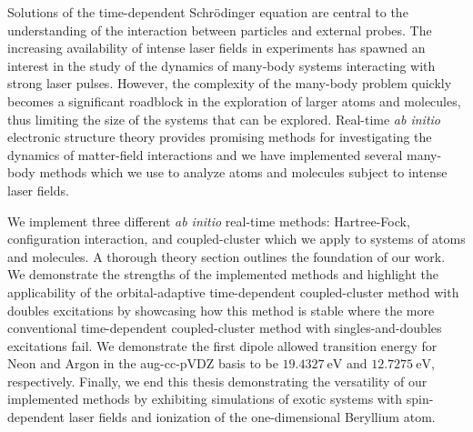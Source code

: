 Solutions of the time-dependent Schrödinger equation are central to the
understanding of the interaction between particles and external probes.
The increasing availability of intense laser fields in experiments has spawned
an interest in the study of the dynamics of many-body systems interacting with
strong laser pulses.
However, the complexity of the many-body problem quickly becomes a significant
roadblock in the exploration of larger atoms and molecules, thus limiting the
size of the systems that can be explored.
Real-time \textit{ab initio} electronic structure theory provides promising
methods for investigating the dynamics of matter-field interactions and we have
implemented several many-body methods which we use to analyze atoms and
molecules subject to intense laser fields.

We implement three different \textit{ab initio} real-time methods:
Hartree-Fock, configuration interaction, and coupled-cluster which we apply to
systems of atoms and molecules.
A thorough theory section outlines the foundation of our work.
We demonstrate the strengths of the implemented methods and highlight the
applicability of the orbital-adaptive time-dependent coupled-cluster method with
doubles excitations by showcasing how this method is stable where the more
conventional time-dependent coupled-cluster method with singles-and-doubles
excitations fail.
We demonstrate the first dipole allowed transition energy for Neon and Argon in
the aug-cc-pVDZ basis to be $\SI{19.4327}{\electronvolt}$ and
$\SI{12.7275}{\electronvolt}$, respectively.
Finally, we end this thesis demonstrating the versatility of our implemented
methods by exhibiting simulations of exotic systems with spin-dependent laser
fields and ionization of the one-dimensional Beryllium atom.
